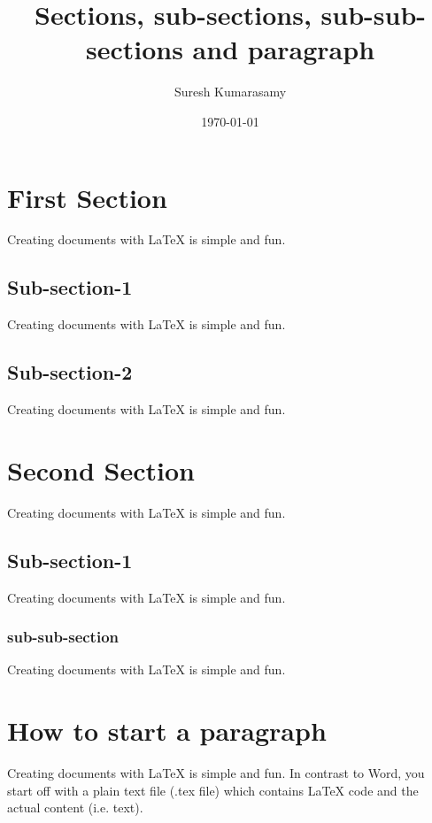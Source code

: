 \documentclass[12pt,draft,twocolumn]{article}
\title{Sections, sub-sections, sub-sub-sections and paragraph}
\date{\today}
\author{Suresh Kumarasamy}
\begin{document}
  \maketitle
  \newpage
\section{First Section}

Creating documents with LaTeX is simple and fun.

\subsection{Sub-section-1}
Creating documents with LaTeX is simple and fun.


\subsection{Sub-section-2}
Creating documents with LaTeX is simple and fun.


\section{Second Section}
Creating documents with LaTeX is simple and fun.

\subsection{Sub-section-1}
Creating documents with LaTeX is simple and fun.


\subsubsection{sub-sub-section}
Creating documents with LaTeX is simple and fun.


\section{How to start a paragraph}

\par Creating documents with LaTeX is simple and fun. In contrast to Word, you start off with a plain text file (.tex file) which contains LaTeX code and the actual content (i.e. text).
\end{document}

